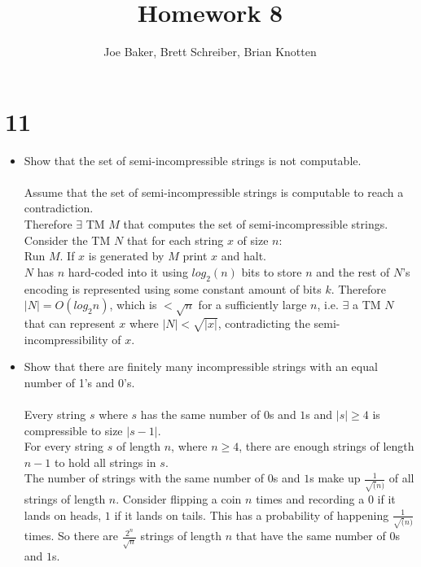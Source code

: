 \documentclass[letterpaper,notitlepage,twoside]{article}
\newcommand\tab[1][1cm]{\hspace*{#1}} %
\begin{document}
\title{Homework 8}
\author{Joe Baker, Brett Schreiber, Brian Knotten}
\maketitle

\section*{11}
\begin{itemize}

\item Show that the set of semi-incompressible strings is not computable. \\\\
Assume that the set of semi-incompressible strings is computable to reach a contradiction. \\
Therefore $\exists$ TM $M$ that computes the set of semi-incompressible strings. \\
Consider the TM $N$ that for each string $x$ of size $n$: \\
\tab Run $M$. If $x$ is generated by $M$ print $x$ and halt. \\
$N$ has $n$ hard-coded into it using $log_{2} (n)$ bits to store $n$ and the rest of $N$'s encoding is represented using some constant amount of bits $k$. Therefore $|N| = O(log_{2} n)$, which is $< \sqrt{n}$ for a sufficiently large $n$, i.e. $\exists$ a TM $N$ that can represent $x$ where $|N| < \sqrt{|x|}$, contradicting the semi-incompressibility of $x$.\\

\item Show that there are finitely many incompressible strings with an equal number of 1's and 0's. \\\\
Every string $s$ where $s$ has the same number of $0$s and $1$s and $|s| \geq 4$ is compressible to size $|s - 1|$.\\
For every string $s$ of length $n$, where $n \geq 4$, there are enough strings of length $n - 1$ to hold all strings in $s$.\\
The number of strings with the same number of $0$s and $1$s make up $\frac{1}{\sqrt(n)}$ of all strings of length $n$.
Consider flipping a coin $n$ times and recording a $0$ if it lands on heads, $1$ if it lands on tails. This has a probability of happening $\frac{1}{\sqrt(n)}$ times.
So there are $\frac{2^n}{\sqrt{n}}$ strings of length $n$ that have the same number of $0$s and $1$s.\\


\end{itemize}
\end{document}
